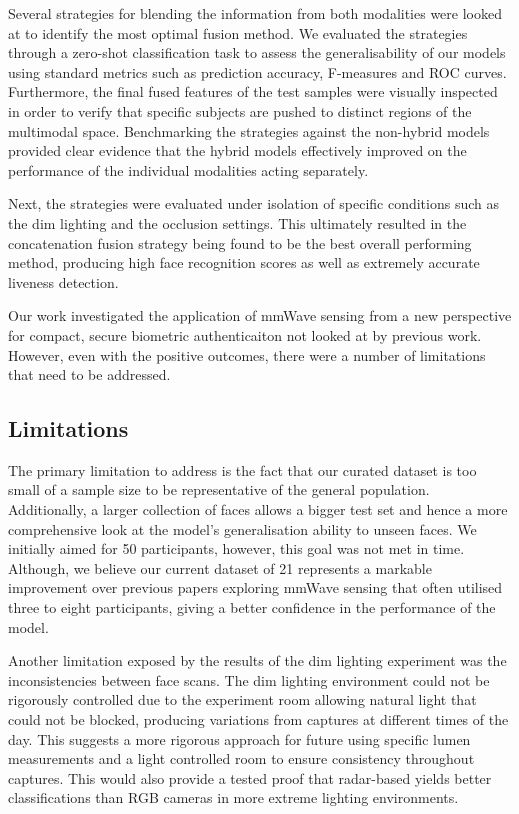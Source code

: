 \documentclass{mpaper}
\begin{document}
Several strategies for blending the information from both modalities were looked at to identify the most optimal fusion method. We evaluated the strategies through a zero-shot classification task to assess the generalisability of our models using standard metrics such as prediction accuracy, F-measures and ROC curves. Furthermore, the final fused features of the test samples were visually inspected in order to verify that specific subjects are pushed to distinct regions of the multimodal space. Benchmarking the strategies against the non-hybrid models provided clear evidence that the hybrid models effectively improved on the performance of the individual modalities acting separately.

Next, the strategies were evaluated  under isolation of specific conditions such as the dim lighting and the occlusion settings. This ultimately resulted in the concatenation fusion strategy being found to be the best overall performing method, producing high face recognition scores as well as extremely accurate liveness detection. 

Our work investigated the application of mmWave sensing from a new perspective for compact, secure biometric authenticaiton not looked at by previous work. However, even with the positive outcomes, there were a number of limitations that need to be addressed.


\subsection{Limitations}
The primary limitation to address is the fact that our curated dataset is too small of a sample size to be representative of the general population. Additionally, a larger collection of faces allows a bigger test set and hence a more comprehensive look at the model's generalisation ability to unseen faces. We initially aimed for 50 participants, however, this goal was not met in time. Although, we believe our current dataset of 21 represents a markable improvement over previous papers exploring mmWave sensing \cite{lim2020dnn,kim2020face,pho2021radar} that often utilised three to eight participants, giving a better confidence in the performance of the model.

Another limitation exposed by the results of the dim lighting experiment was the inconsistencies between face scans. The dim lighting environment could not be rigorously controlled due to the experiment room allowing natural light that could not be blocked, producing variations from captures at different times of the day. This suggests a more rigorous approach for future using  specific lumen measurements and a light controlled room to ensure consistency throughout captures. This would also provide a tested proof that radar-based yields better classifications than RGB cameras in more extreme lighting environments.
\end{document}
